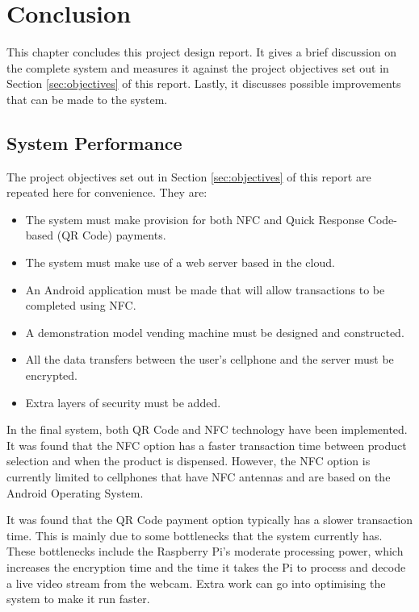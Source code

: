 \chapter{Conclusion}
\label{chap:7}

This chapter concludes this project design report. It gives a brief discussion on the
complete system and measures it against the project objectives set out in Section
\ref{sec:objectives} of this report. Lastly, it discusses possible improvements that can
be made to the system. 

\section{System Performance}

The project objectives set out in Section \ref{sec:objectives} of this report are repeated
here for convenience. They are:

\begin{itemize}
  \item The system must make provision for both NFC and Quick Response Code-based (QR
  Code) payments.
  \item The system must make use of a web server based in the cloud.
  \item An Android application must be made that will allow transactions to be completed
  using NFC.
  \item A demonstration model vending machine must be designed and constructed.
  \item All the data transfers between the user's cellphone and the server must be
  encrypted.
  \item Extra layers of security must be added. 
\end{itemize}

In the final system, both QR Code and NFC technology have been implemented. It was found
that the NFC option has a faster transaction time between product selection and
when the product is dispensed.
However, the NFC option is currently limited to cellphones that have NFC antennas and are
based on the Android Operating System.

It was found that the QR Code payment option typically has a slower transaction time. This
is mainly due to some bottlenecks that the system currently has. These bottlenecks include
the Raspberry Pi's moderate processing power, which increases the encryption time and the
time it takes the Pi to process and decode a live video stream from the webcam. Extra
work can go into optimising the system to make it run faster.

